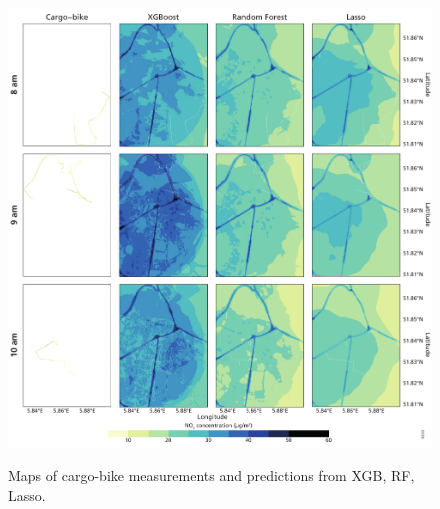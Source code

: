 \documentclass{article}
\begin{document}
\begin{figure}[H]
    \includegraphics[width=\linewidth]{maps.pdf}
    \label{nldepred}
    \caption {Maps of cargo-bike measurements and predictions from XGB,  RF,  Lasso.}
\end{figure}
\end{document}

